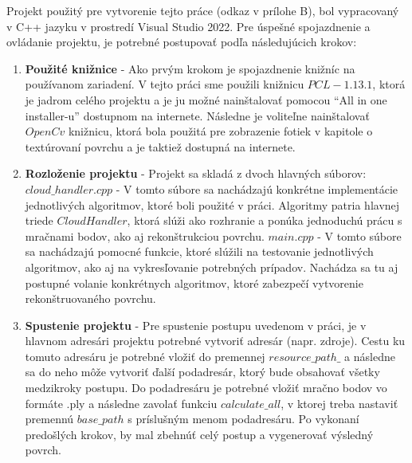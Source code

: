 Projekt použitý pre vytvorenie tejto práce (odkaz v prílohe B), bol vypracovaný v C++ jazyku v prostredí Visual Studio 2022. Pre úspešné spojazdnenie a ovládanie projektu, je potrebné postupovať podľa následujúcich krokov: 

\begin{enumerate}
    \item\textbf{Použité knižnice} - Ako prvým krokom je spojazdnenie knižníc na používanom zariadení. V tejto práci sme použili knižnicu $PCL-1.13.1$, ktorá je jadrom celého projektu a je ju možné nainštalovať pomocou ``All in one installer-u'' dostupnom na internete. Následne je voliteľne nainštalovať $OpenCv$ knižnicu, ktorá bola použitá pre zobrazenie fotiek v kapitole o textúrovaní povrchu a je taktiež dostupná na internete.
    \item\textbf{Rozloženie projektu} - Projekt sa skladá z dvoch hlavných súborov:
    \newline $cloud\_handler.cpp$ - V tomto súbore sa nachádzajú konkrétne implementácie jednotlivých algoritmov, ktoré boli použité v práci. Algoritmy patria hlavnej triede $CloudHandler$, ktorá slúži ako rozhranie a ponúka jednoduchú prácu s mračnami bodov, ako aj rekonštrukciou povrchu.
    \newline $main.cpp$ - V tomto súbore sa nachádzajú pomocné funkcie, ktoré  slúžili na testovanie jednotlivých algoritmov, ako aj na vykresľovanie potrebných prípadov. Nachádza sa tu aj postupné volanie konkrétnych algoritmov, ktoré zabezpečí vytvorenie rekonštruovaného povrchu.
    \item\textbf{Spustenie projektu} - Pre spustenie postupu uvedenom v práci, je v hlavnom adresári projektu potrebné vytvoriť adresár (napr. zdroje). Cestu ku tomuto adresáru je potrebné vložiť do premennej $resource\_path\_$ a následne sa do neho môže vytvoriť ďalší podadresár, ktorý bude obsahovať všetky medzikroky postupu. Do podadresáru je potrebné vložiť mračno bodov vo formáte .ply a následne zavolať funkciu $calculate\_all$, v ktorej treba nastaviť premennú $base\_path$ s príslušným menom podadresáru. Po vykonaní predošlých krokov, by mal zbehnúť celý postup a vygenerovať výsledný povrch.
\end{enumerate}